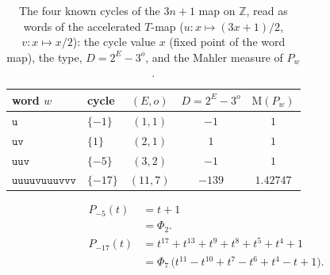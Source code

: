 \begin{table}[h]\centering\small\renewcommand{\arraystretch}{1.25}
\begin{tabular}{@{}llccc@{}}
\toprule
word $w$ & cycle & $(E,o)$ & $D=2^{E}-3^{o}$ & $\mathrm{M}(P_w)$\\
\midrule
$\mathtt{u}$ & $\{-1\}$ & $(1,1)$ & $-1$ & $1$\\
$\mathtt{uv}$ & $\{1\}$ & $(2,1)$ & $1$ & $1$\\
$\mathtt{uuv}$ & $\{-5\}$ & $(3,2)$ & $-1$ & $1$\\
$\mathtt{uuuuvuuuvvv}$ & $\{-17\}$ & $(11,7)$ & $-139$ & $1.42747$\\
\bottomrule
\end{tabular}
\caption{The four known cycles of the $3n+1$ map on $\mathbb{Z}$, read as words of the accelerated $T$-map ($u:x\mapsto(3x+1)/2$, $v:x\mapsto x/2$): the cycle value $x$ (fixed point of the word map), the type, $D=2^E-3^o$, and the Mahler measure of $P_w$.}\label{tab:cycles}
\end{table}
\begin{align*}
P_{-5}(t) &= t + 1\\
 &= \Phi_{2}.\\[4pt]
P_{-17}(t) &= t^{17} + t^{13} + t^{9} + t^{8} + t^{5} + t^{4} + 1\\
 &= \Phi_{7}\,\bigl(t^{11} - t^{10} + t^{7} - t^{6} + t^{4} - t + 1\bigr).
\end{align*}
